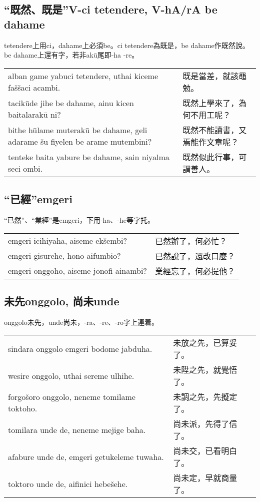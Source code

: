 \documentclass{article}
\begin{document}
\subsection{“既然、既是”V-ci tetendere, V-hA/rA be dahame}
\noindent tetendere上用ci，dahame上必須be。ci tetendere為既是，be dahame作既然說。be dahame上還有字，若非ak\={u}尾即-ha -re。
\begin{center}
    \begin{tabularx}{\textwidth}{XX}
        alban game yabuci tetendere, uthai kiceme fa\v{s}\v{s}aci acambi. &既是當差，就該黽勉。\\
        tacik\={u}de jihe be dahame, ainu kicen baitalarak\={u} ni? &既然上學來了，為何不用工呢？\\
        bithe h\={u}lame muterak\={u} be dahame, geli adarame \v{s}u fiyelen be arame mutembini? & 既然不能讀書，又焉能作文章呢？\\
        tenteke baita yabure be dahame, sain niyalma seci ombi. & 既然似此行事，可謂善人。
    \end{tabularx}
\end{center}

\subsection{“已經”emgeri}
\noindent “已然”、“業經”是emgeri，下用-ha、-he等字托。
\begin{center}
    \begin{tabularx}{\textwidth}{XX}
        emgeri icihiyaha, aiseme ek\v{s}embi? & 已然辦了，何必忙？\\
        emgeri gisurehe, hono aifumbio? & 已然說了，還改口麼？\\
        emgeri onggoho, aiseme jonofi ainambi? &業經忘了，何必提他？
    \end{tabularx}
\end{center}

\subsection{未先onggolo, 尚未unde}
\noindent onggolo未先，unde尚未，-ra、-re、-ro字上連着。
\begin{center}
    \begin{tabularx}{\textwidth}{XX}
        sindara onggolo emgeri bodome jabduha. & 未放之先，已算妥了。\\
        wesire onggolo, uthai sereme ulhihe. & 未陞之先，就覺悟了。\\
        forgo\v{s}oro onggolo, neneme tomilame toktoho. & 未調之先，先擬定了。\\
        tomilara unde de, neneme mejige baha. &尚未派，先得了信了。\\
        afabure unde de, emgeri getukeleme tuwaha. & 尚未交，已看明白了。\\
        toktoro unde de, aifinici hebe\v{s}ehe. & 尚未定，早就商量了。
    \end{tabularx}
\end{center}
\end{document}
